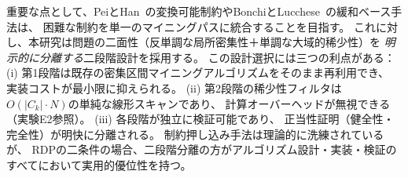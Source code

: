 重要な点として、PeiとHan~\cite{pei2001convertible}の変換可能制約やBonchiとLucchese~\cite{bonchi2005tougher}の緩和ベース手法は、
困難な制約を単一のマイニングパスに統合することを目指す。
これに対し、本研究は問題の二面性（反単調な局所密集性＋単調な大域的稀少性）を
\emph{明示的に分離する}二段階設計を採用する。
この設計選択には三つの利点がある：
(i) 第1段階は既存の密集区間マイニングアルゴリズムをそのまま再利用でき、
実装コストが最小限に抑えられる。
(ii) 第2段階の稀少性フィルタは$O(|C_k| \cdot N)$の単純な線形スキャンであり、
計算オーバーヘッドが無視できる（実験E2参照）。
(iii) 各段階が独立に検証可能であり、
正当性証明（健全性・完全性）が明快に分離される。
制約押し込み手法は理論的に洗練されているが、
RDPの二条件の場合、二段階分離の方がアルゴリズム設計・実装・検証の
すべてにおいて実用的優位性を持つ。
